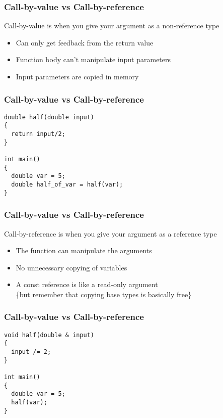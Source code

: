 \documentclass[14pt,a4paper,dvipsnames,usenames]{beamer}
\begin{document}
\begin{frame}[fragile]
  \frametitle{Call-by-value vs Call-by-reference}

  Call-by-value is when you give your argument as a {\color{Marty}non-reference} type

  \vspace{.5em}
  \begin{itemize}
    \setlength\itemsep{.5em}
    \item Can only get feedback from the return value
    \item Function body can't manipulate input parameters
    \item Input parameters are copied in memory
  \end{itemize}

\end{frame}

\begin{frame}[fragile]
  \frametitle{Call-by-value vs Call-by-reference}

  \begin{lstlisting}[basicstyle=\ttfamily]
double half(double input)
{
  return input/2;
}

int main()
{
  double var = 5;
  double half_of_var = half(var);
}
  \end{lstlisting}
  
\end{frame}

\begin{frame}[fragile]
  \frametitle{Call-by-value vs Call-by-reference}

  Call-by-reference is when you give your argument as a {\color{FeebleWeek}reference} type

  \vspace{.5em}
  \begin{itemize}
    \setlength\itemsep{.5em}
    \item The function can manipulate the arguments
    \item No unnecessary copying of variables
    \item A const reference is like a read-only argument\\
      {\fontsize{10pt}{10pt}\selectfont{}\{but remember that copying base types is basically free\}}
  \end{itemize}
  
\end{frame}

\begin{frame}[fragile]
  \frametitle{Call-by-value vs Call-by-reference}

  \begin{lstlisting}[basicstyle=\ttfamily]
void half(double & input)
{
  input /= 2;
}

int main()
{
  double var = 5;
  half(var);
}
  \end{lstlisting}
  
\end{frame}
\end{document}
